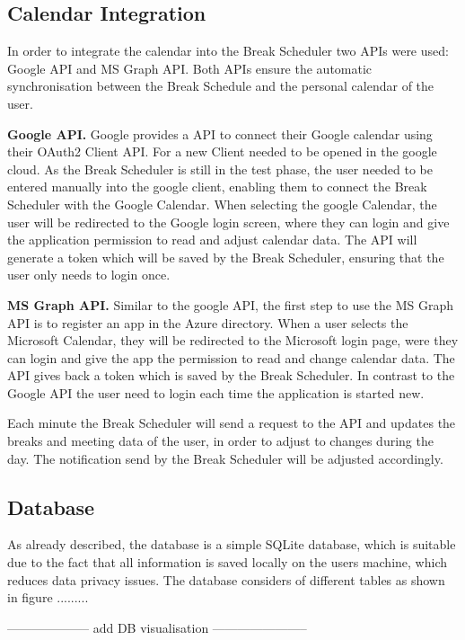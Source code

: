 \documentclass{hasel_thesis}
\begin{document}
\subsection{Calendar Integration} \label{calendar_integration}

In order to integrate the calendar into the Break Scheduler two APIs were used: Google API and MS Graph API. Both APIs ensure the automatic synchronisation between the Break Schedule and the personal calendar of the user. 

\textbf{Google API.} Google provides a API to connect their Google calendar using their OAuth2 Client API. For a new Client needed to be opened in the google cloud. As the Break Scheduler is still in the test phase, the user needed to be entered manually into the google client, enabling them to connect the Break Scheduler with the Google Calendar. When selecting the google Calendar, the user will be redirected to the Google login screen, where they can login and give the application permission to read and adjust calendar data. The API will generate a token which will be saved by the Break Scheduler, ensuring that the user only needs to login once.

\textbf{MS Graph API.} Similar to the google API, the first step to use the MS Graph API is to register an app in the Azure directory. When a user selects the Microsoft Calendar, they will be redirected to the Microsoft login page, were they can login and give the app the permission to read and change calendar data. The API gives back a token which is saved by the Break Scheduler. In contrast to the Google API the user need to login each time the application is started new.

Each minute the Break Scheduler will send a request to the API and updates the breaks and meeting data of the user, in order to adjust to changes during the day. The notification send by the Break Scheduler will be adjusted accordingly.

\subsection{Database} \label{database}
As already described, the database is a simple SQLite database, which is suitable due to the fact that all information is saved locally on the users machine, which reduces data privacy issues. The database considers of different tables as shown in figure .........

-------------------- add DB visualisation  -----------------------
\end{document}
